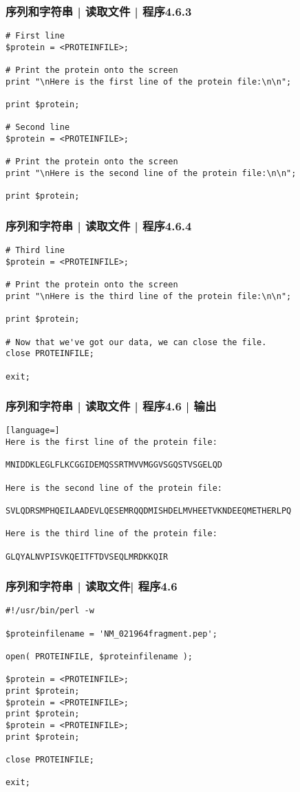 \begin{frame}[fragile]
  \frametitle{序列和字符串 | 读取文件 | 程序4.6.3}
\begin{lstlisting}[firstnumber=19,basicstyle=\small\tt]
# First line
$protein = <PROTEINFILE>;

# Print the protein onto the screen
print "\nHere is the first line of the protein file:\n\n";

print $protein;

# Second line
$protein = <PROTEINFILE>;

# Print the protein onto the screen
print "\nHere is the second line of the protein file:\n\n";

print $protein;
\end{lstlisting}
\end{frame}

\begin{frame}[fragile]
  \frametitle{序列和字符串 | 读取文件 | 程序4.6.4}
\begin{lstlisting}[firstnumber=35]
# Third line
$protein = <PROTEINFILE>;

# Print the protein onto the screen
print "\nHere is the third line of the protein file:\n\n";

print $protein;

# Now that we've got our data, we can close the file.
close PROTEINFILE;

exit;
\end{lstlisting}
\end{frame}

\begin{frame}[fragile]
  \frametitle{序列和字符串 | 读取文件 | 程序4.6 | 输出}
\begin{lstlisting}[language=]
Here is the first line of the protein file:

MNIDDKLEGLFLKCGGIDEMQSSRTMVVMGGVSGQSTVSGELQD

Here is the second line of the protein file:

SVLQDRSMPHQEILAADEVLQESEMRQQDMISHDELMVHEETVKNDEEQMETHERLPQ

Here is the third line of the protein file:

GLQYALNVPISVKQEITFTDVSEQLMRDKKQIR
\end{lstlisting}
\end{frame}

\begin{frame}[fragile]
  \frametitle{序列和字符串 | 读取文件| \alert{程序4.6}}
\begin{lstlisting}[basicstyle=\small\tt]
#!/usr/bin/perl -w

$proteinfilename = 'NM_021964fragment.pep';

open( PROTEINFILE, $proteinfilename );

$protein = <PROTEINFILE>;
print $protein;
$protein = <PROTEINFILE>;
print $protein;
$protein = <PROTEINFILE>;
print $protein;

close PROTEINFILE;

exit;
\end{lstlisting}
\end{frame}


